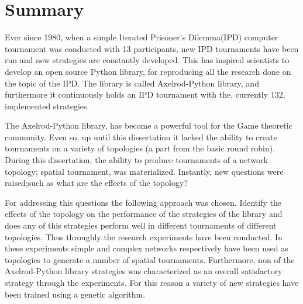 \chapter{Summary}

Ever since 1980, when a simple Iterated Prisoner's Dilemma(IPD) computer
tournament was conducted with 13 participants, new IPD tournaments have been run
and new strategies are constantly developed. This has inspired scientists to develop
an open source Python library, for reproducing all the research done on the topic
of the IPD. The library is called Axelrod-Python library, and furthermore it continuously holds
an IPD tournament with the, currently 132, implemented strategies.

The Axelrod-Python library, has become a powerful tool for the Game theoretic community.
Even so, up until this dissertation it lacked the ability to create tournaments on a variety of
topologies (a part from the basic round robin).
During this dissertation, the ability to
produce tournaments of a network topology; spatial tournament, was materialized.
Instantly, new questions were raised;such as what are the effects of the topology?

For addressing this questions the following approach was chosen. Identify the
effects of the topology on the performance of the strategies of the library and
does any of this strategies perform well in different tournaments of different
topologies. Thus throughly the research experiments have been conducted. In these
experiments simple and complex networks respectively have been used as topologies
to generate a number of spatial tournaments. Furthermore, non of the
Axelrod-Python library strategies was characterized as an overall satisfactory
strategy through the experiments. For this reason a variety of new strategies have
been trained using a genetic algorithm.
